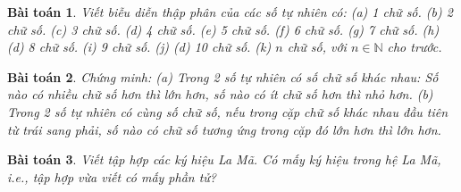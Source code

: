 \documentclass{article}
\newtheorem{baitoan}{Bài toán}
\begin{document}
\begin{baitoan}
	Viết biễu diễn thập phân của các số tự nhiên có: (a) 1 chữ số. (b) 2 chữ số. (c) 3 chữ số. (d) 4 chữ số. (e) 5 chữ số. (f) 6 chữ số. (g) 7 chữ số. (h) (d) 8 chữ số. (i) 9 chữ số. (j) (d) 10 chữ số. (k) $n$ chữ số, với $n\in\mathbb{N}$ cho trước. 
\end{baitoan}

\begin{baitoan}
	Chứng minh: (a) Trong 2 số tự nhiên có số chữ số khác nhau: Số nào có nhiều chữ số hơn thì lớn hơn, số nào có ít chữ số hơn thì nhỏ hơn. (b) Trong 2 số tự nhiên có cùng số chữ số, nếu trong cặp chữ số khác nhau đầu tiên từ trái sang phải, số nào có chữ số tương ứng trong cặp đó lớn hơn thì lớn hơn.
\end{baitoan}

\begin{baitoan}
	Viết tập hợp các ký hiệu La Mã. Có mấy ký hiệu trong hệ La Mã, i.e., tập hợp vừa viết có mấy phần tử?
\end{baitoan}


\printbibliography[heading=bibintoc]
	
\end{document}
